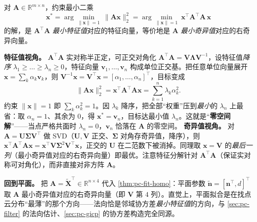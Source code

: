 \begin{theorem}[齐次最小二乘 = 最小特征值/奇异向量]\label{thm:pc-fit-homo}
对 $\mathbf{A}\in\mathbb{R}^{m\times n}$，约束最小二乘
\begin{equation}
  \mathbf{x}^\ast=\arg\min_{\|\mathbf{x}\|=1}\ \|\mathbf{A}\mathbf{x}\|_2^2
  =\arg\min_{\|\mathbf{x}\|=1}\ \mathbf{x}^\top\mathbf{A}^\top\mathbf{A}\,\mathbf{x}
  \label{eq:pc-fit-rayleigh}
\end{equation}
的解，是 $\mathbf{A}^\top\mathbf{A}$ \emph{最小特征值}对应的特征向量，等价地是 $\mathbf{A}$ \emph{最小奇异值}对应的右奇异向量。
\end{theorem}

\begin{derivation}[特征值视角与奇异值视角]
\textbf{特征值视角。} $\mathbf{A}^\top\mathbf{A}$ 实对称半正定，可正交对角化 $\mathbf{A}^\top\mathbf{A}=\mathbf{V}\boldsymbol{\Lambda}\mathbf{V}^{-1}$，设特征值\emph{降序} $\lambda_1\ge\dots\ge\lambda_n\ge0$，特征向量 $\mathbf{v}_1,\dots,\mathbf{v}_n$ 构成单位正交基。把任意单位向量展开 $\mathbf{x}=\sum_k\alpha_k\mathbf{v}_k$，则 $\mathbf{V}^{-1}\mathbf{x}=\mathbf{V}^\top\mathbf{x}=[\alpha_1,\dots,\alpha_n]^\top$，目标变成
\begin{equation}
  \|\mathbf{A}\mathbf{x}\|_2^2=\mathbf{x}^\top\mathbf{A}^\top\mathbf{A}\mathbf{x}=\sum_{k=1}^{n}\lambda_k\alpha_k^2 .
  \label{eq:pc-fit-spectral}
\end{equation}
约束 $\|\mathbf{x}\|=1$ 即 $\sum_k\alpha_k^2=1$。因 $\lambda_k$ 降序，把全部“权重”压到\emph{最小}的 $\lambda_n$ 上最省：取 $\alpha_n=1$、其余为 $0$，得 $\mathbf{x}^\ast=\mathbf{v}_n$，目标达最小值 $\lambda_n$。这就是“\textbf{零空间解}”——当点严格共面时 $\lambda_n=0$，$\mathbf{v}_n$ 恰落在 $\mathbf{A}$ 的零空间。
\textbf{奇异值视角。} 对 $\mathbf{A}=\mathbf{U}\boldsymbol{\Sigma}\mathbf{V}^\top$ 做 SVD（$\mathbf{U},\mathbf{V}$ 正交、$\boldsymbol{\Sigma}$ 对角存奇异值，降序），则 $\mathbf{x}^\top\mathbf{A}^\top\mathbf{A}\mathbf{x}=\mathbf{x}^\top\mathbf{V}\boldsymbol{\Sigma}^2\mathbf{V}^\top\mathbf{x}$，正交的 $\mathbf{U}$ 在二范数下被消掉。同理取 $\mathbf{x}=\mathbf{V}$ 的\emph{最后一列}（最小奇异值对应的右奇异向量）即最优。注意特征分解针对 $\mathbf{A}^\top\mathbf{A}$（保证实对称可对角化），而非直接对非方阵 $\mathbf{A}$。
\end{derivation}

\noindent\textbf{回到平面。} 把 $\mathbf{A}=\tilde{\mathbf{X}}^\top\in\mathbb{R}^{n\times4}$ 代入 \cref{thm:pc-fit-homo}：平面参数 $\tilde{\mathbf{n}}=[\mathbf{n}^\top,d]^\top$ 取 $\mathbf{A}$ 最小奇异值对应的右奇异向量（即 $\mathbf{V}$ 第 $4$ 列）。直觉上，平面拟合是在找点云分布“最薄”的那个方向——法向恰是邻域协方差\emph{最小特征值}的方向，与 \cref{sec:pc-filter} 的法向估计、\cref{sec:pc-gicp} 的协方差构造完全同源。

